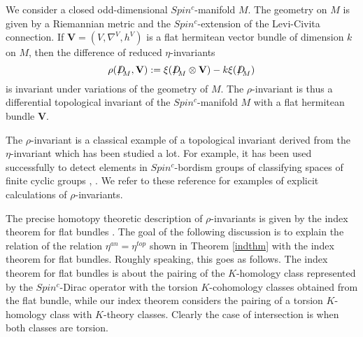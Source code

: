 \documentclass[12pt]{article}
\newcommand{\bV}{{\mathbf{V}}}
\newcommand{\Dirac}{{D\hspace{-0.27cm}/}}
\begin{document}
We consider a closed odd-dimensional $Spin^{c}$-manifold $M$. The geometry on $M$ is given by a 
  Riemannian metric and the  $Spin^{c}$-extension of the Levi-Civita connection.
 If $\bV=(V,\nabla^{V},h^{V})$ is a  flat hermitean vector bundle of dimension $k$ on $M$,
%
% 
 then the difference of reduced $\eta$-invariants
 \begin{equation}\label{eq3000}\rho(\Dirac_{M},\bV):=\xi(\Dirac_{M}\otimes \bV)-k\xi(\Dirac_{M})\end{equation}
 is invariant under variations of the geometry of $M$.
 The $\rho$-invariant  is thus a differential topological invariant of the $Spin^{c}$-manifold $M$ with a flat hermitean bundle $\bV$.
 
  The $\rho$-invariant is a classical  example of a topological invariant derived from the $\eta$-invariant  which has been studied a lot. 
  For example,  it has been    used    successfully    to detect elements in $Spin^{c}$-bordism groups of classifying spaces of finite cyclic groups \cite{MR870805}, \cite{MR883375}. We refer to these reference for examples of explicit calculations of $\rho$-invariants.
 
 
The precise homotopy theoretic description of $\rho$-invariants is given by  
 the index theorem for flat bundles \cite[Thm. 5.3]{MR0397799}.
The goal of the following discussion is to explain the relation of  the relation $\eta^{an}=\eta^{top}$ shown in Theorem \ref{indthm} with the index theorem for flat bundles.
Roughly speaking,   this goes as follows. The index theorem for flat bundles is about the pairing of the $K$-homology class represented by the $Spin^{c}$-Dirac operator with the torsion $K$-cohomology classes obtained from the flat bundle, while our index theorem considers the pairing of a torsion $K$-homology class with $K$-theory classes. Clearly the case of intersection is when both classes are torsion.
\end{document}
